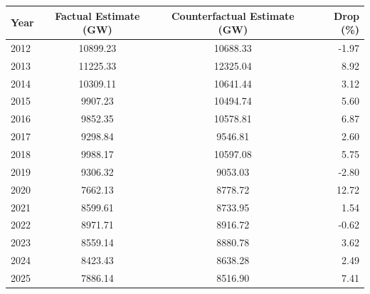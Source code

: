 \begin{tabular}{lccr}
\toprule
Year & Factual Estimate (GW) & Counterfactual Estimate (GW) & Drop (\%) \\
\midrule
2012 & 10899.23 & 10688.33 & -1.97 \\
2013 & 11225.33 & 12325.04 & 8.92 \\
2014 & 10309.11 & 10641.44 & 3.12 \\
2015 & 9907.23 & 10494.74 & 5.60 \\
2016 & 9852.35 & 10578.81 & 6.87 \\
2017 & 9298.84 & 9546.81 & 2.60 \\
2018 & 9988.17 & 10597.08 & 5.75 \\
2019 & 9306.32 & 9053.03 & -2.80 \\
2020 & 7662.13 & 8778.72 & 12.72 \\
2021 & 8599.61 & 8733.95 & 1.54 \\
2022 & 8971.71 & 8916.72 & -0.62 \\
2023 & 8559.14 & 8880.78 & 3.62 \\
2024 & 8423.43 & 8638.28 & 2.49 \\
2025 & 7886.14 & 8516.90 & 7.41 \\
\bottomrule
\end{tabular}
